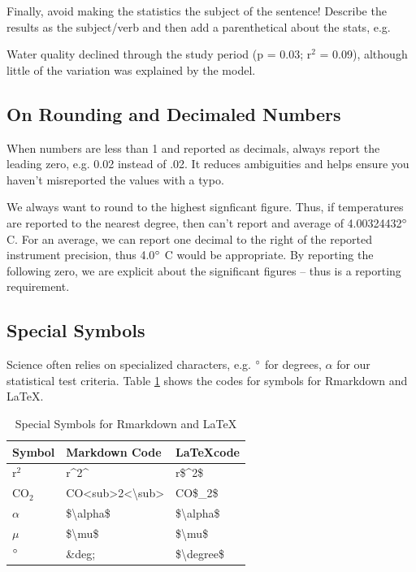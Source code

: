 \documentclass{article}\usepackage[]{graphicx}\usepackage[]{color}
\begin{document}
Finally, avoid making the statistics the subject of the sentence! Describe the results as the subject/verb and then add a parenthetical about the stats, e.g.

\noindent Water quality declined through the study period (p = 0.03; r$^2$ = 0.09), although little of the variation was explained by the model. 

\subsection{On Rounding and Decimaled Numbers}

When numbers are less than 1 and reported as decimals, always report the leading zero, e.g. 0.02 instead of .02. It reduces ambiguities and helps ensure you haven't misreported the values with a typo.

We always want to round to the highest signficant figure. Thus, if temperatures are reported to the nearest degree, then can't report and average of 4.00324432$\degree$ C. For an average, we can report one decimal to the right of the reported instrument precision, thus 4.0$\degree$ C would be appropriate. By reporting the following zero, we are explicit about the significant figures -- thus is a reporting requirement. 

\subsection{Special Symbols}

Science often relies on specialized characters, e.g. $\degree$ for degrees, $\alpha$ for our statistical test criteria. Table \ref{tab:symbols} shows the codes for symbols for Rmarkdown and \LaTeX.

\begin{table}
\caption{Special Symbols for Rmarkdown and \LaTeX}
\label{tab:symbols}
\begin{tabular}{lll}\hline
Symbol  & Markdown Code & \LaTeX code \\ \hline\hline
r$^2$     & r\^{}2\^{} &  r\$\^{}2\$ \\
CO$_2$    & CO<sub>2<\textbackslash sub> & CO\$\_2\$\\

$\alpha$ & \$\textbackslash alpha\$ & \$\textbackslash alpha\$ \\

$\mu$ & \$\textbackslash mu\$ & \$\textbackslash mu\$ \\


$\degree$ & \&deg; & \$\textbackslash degree\$ \\ 
\hline
\end{tabular}
\end{table}
\end{document}
